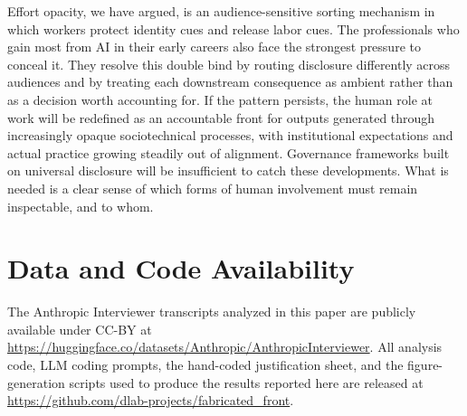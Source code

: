 \documentclass[pdflatex,sn-basic]{sn-jnl}%
\theoremstyle{thmstyleone}%
\theoremstyle{thmstyletwo}%
\theoremstyle{thmstylethree}%
\begin{document}
Effort opacity, we have argued, is an audience-sensitive sorting mechanism in which workers protect identity cues and release labor cues. The professionals who gain most from AI in their early careers also face the strongest pressure to conceal it. They resolve this double bind by routing disclosure differently across audiences and by treating each downstream consequence as ambient rather than as a decision worth accounting for. If the pattern persists, the human role at work will be redefined as an accountable front for outputs generated through increasingly opaque sociotechnical processes, with institutional expectations and actual practice growing steadily out of alignment. Governance frameworks built on universal disclosure will be insufficient to catch these developments. What is needed is a clear sense of which forms of human involvement must remain inspectable, and to whom.

\section*{Data and Code Availability}

The Anthropic Interviewer transcripts analyzed in this paper are publicly available under CC-BY at \url{https://huggingface.co/datasets/Anthropic/AnthropicInterviewer}. All analysis code, LLM coding prompts, the hand-coded justification sheet, and the figure-generation scripts used to produce the results reported here are released at \url{https://github.com/dlab-projects/fabricated_front}.

\end{document}
